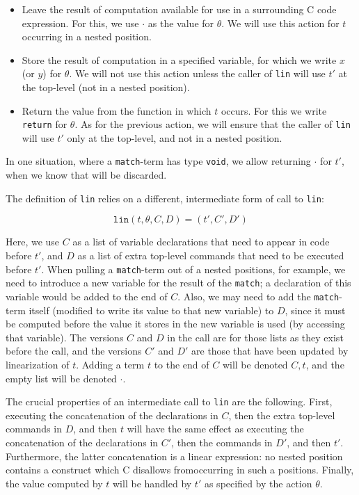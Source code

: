 \documentclass{book}[12pt]
\begin{document}
\begin{itemize}
\item Leave the result of computation available for use in a
surrounding C code expression.  For this, we use $\cdot$ as the value
for $\theta$.  We will use this action for $t$ occurring in a nested
position.

\item Store the result of computation in a specified variable, for
which we write $x$ (or $y$) for $\theta$.  We will not use this action
unless the caller of \texttt{lin} will use $t'$ at the top-level (not
in a nested position).

\item Return the value from the function in which $t$ occurs.  For this
we write \texttt{return} for $\theta$.  As for the previous action, we
will ensure that the caller of \texttt{lin} will use $t'$ only at the
top-level, and not in a nested position.

\end{itemize}

\noindent In one situation, where a \texttt{match}-term has type
\texttt{void}, we allow returning $\cdot$ for $t'$, when we know that
will be discarded.

The definition of \texttt{lin} relies on a different, intermediate
form of call to \texttt{lin}:

\[ \texttt{lin}(t,\theta,C,D) = (t',C',D') \]

\noindent
Here, we use $C$ as a list of variable declarations that need to
appear in code before $t'$, and $D$ as a list of extra top-level
commands that need to be executed before $t'$.  When pulling a
\texttt{match}-term out of a nested positions, for example, we need to
introduce a new variable for the result of the \texttt{match}; a
declaration of this variable would be added to the end of $C$.  Also,
we may need to add the \texttt{match}-term itself (modified to write
its value to that new variable) to $D$, since it must be computed
before the value it stores in the new variable is used (by accessing
that variable).  The versions $C$ and $D$ in the call are for those
lists as they exist before the call, and the versions $C'$ and $D'$
are those that have been updated by linearization of $t$.  Adding a
term $t$ to the end of $C$ will be denoted $C,t$, and the empty list
will be denoted $\cdot$.  

The crucial properties of an intermediate call to \texttt{lin} are the
following.  First, executing the concatenation of the declarations in
$C$, then the extra top-level commands in $D$, and then $t$ will have
the same effect as executing the concatenation of the declarations in
$C'$, then the commands in $D'$, and then $t'$.  Furthermore, the
latter concatenation is a linear expression: no nested position
contains a construct which C disallows fromoccurring in such a
positions.  Finally, the value computed by $t$ will be handled by $t'$
as specified by the action $\theta$.
\end{document}
